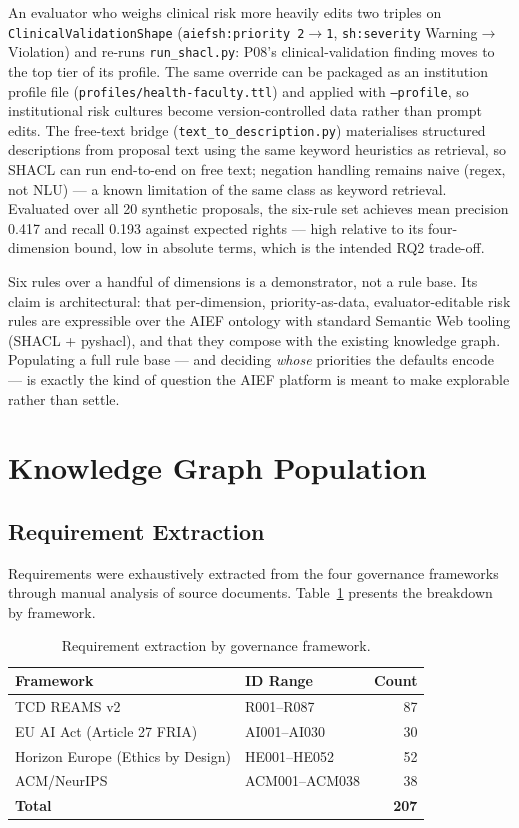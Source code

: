 An evaluator who weighs clinical risk more heavily edits two triples on \texttt{ClinicalValidationShape} (\texttt{aiefsh:priority 2}$\rightarrow$\texttt{1}, \texttt{sh:severity} Warning$\rightarrow$Violation) and re-runs \texttt{run\_shacl.py}: P08's clinical-validation finding moves to the top tier of its profile. The same override can be packaged as an institution profile file (\texttt{profiles/health-faculty.ttl}) and applied with \texttt{--profile}, so institutional risk cultures become version-controlled data rather than prompt edits. The free-text bridge (\texttt{text\_to\_description.py}) materialises structured descriptions from proposal text using the same keyword heuristics as retrieval, so SHACL can run end-to-end on free text; negation handling remains naive (regex, not NLU) --- a known limitation of the same class as keyword retrieval. Evaluated over all 20 synthetic proposals, the six-rule set achieves mean precision 0.417 and recall 0.193 against expected rights --- high relative to its four-dimension bound, low in absolute terms, which is the intended RQ2 trade-off.

Six rules over a handful of dimensions is a demonstrator, not a rule base. Its claim is architectural: that per-dimension, priority-as-data, evaluator-editable risk rules are expressible over the AIEF ontology with standard Semantic Web tooling (SHACL + pyshacl), and that they compose with the existing knowledge graph. Populating a full rule base --- and deciding \emph{whose} priorities the defaults encode --- is exactly the kind of question the AIEF platform is meant to make explorable rather than settle.


\section{Knowledge Graph Population}
\label{sec:kg}

\subsection{Requirement Extraction}

Requirements were exhaustively extracted from the four governance frameworks through manual analysis of source documents. Table~\ref{tab:requirements} presents the breakdown by framework.

\begin{table}[htbp]
\centering
\caption{Requirement extraction by governance framework.}
\label{tab:requirements}
\begin{tabular}{llr}
\toprule
\textbf{Framework} & \textbf{ID Range} & \textbf{Count} \\
\midrule
TCD REAMS v2 & R001--R087 & 87 \\
EU AI Act (Article 27 FRIA) & AI001--AI030 & 30 \\
Horizon Europe (Ethics by Design) & HE001--HE052 & 52 \\
ACM/NeurIPS & ACM001--ACM038 & 38 \\
\midrule
\textbf{Total} & & \textbf{207} \\
\bottomrule
\end{tabular}
\end{table}

